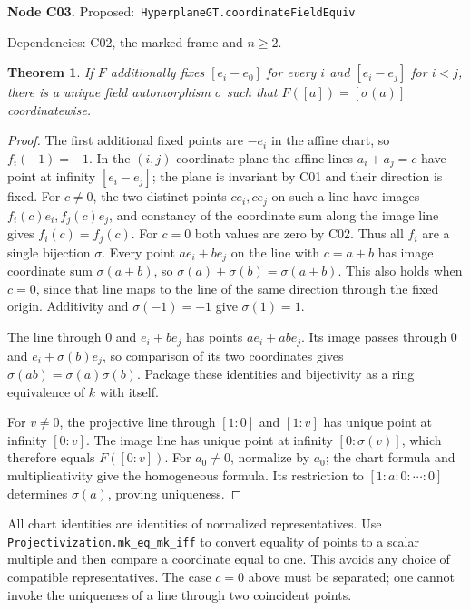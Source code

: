 \documentclass[11pt]{article}
\newtheorem{theorem}{Theorem}[section]
\theoremstyle{remark}\newtheorem{remark}[theorem]{Remark}
\newcommand{\code}[1]{\nolinkurl{#1}}
\newcommand{\node}[3]{\par\Needspace{8\baselineskip}\smallskip\noindent\textbf{Node #1.}\quad
 \textsf{Proposed:}\ \code{#2}\par\noindent
 \textsf{Dependencies:} #3.\par\smallskip}
\begin{document}
\node{C03}{HyperplaneGT.coordinateFieldEquiv}{C02, the marked frame and $n\ge2$}
\begin{theorem}\label{thm:c03}
If $F$ additionally fixes $[e_i-e_0]$ for every $i$ and
$[e_i-e_j]$ for $i<j$, there is a unique field automorphism
$\sigma$ such that $F([a])=[\sigma(a)]$ coordinatewise.
\end{theorem}
\begin{proof}
The first additional fixed points are $-e_i$ in the affine
chart, so $f_i(-1)=-1$. In the $(i,j)$ coordinate plane the
affine lines $a_i+a_j=c$ have point at infinity $[e_i-e_j]$;
the plane is invariant by C01 and their direction is fixed.
For $c\ne0$, the two distinct points $ce_i,ce_j$ on such a
line have images $f_i(c)e_i,f_j(c)e_j$, and constancy of the
coordinate sum along the image line gives $f_i(c)=f_j(c)$.
For $c=0$ both values are zero by C02. Thus all $f_i$ are a
single bijection $\sigma$. Every point $ae_i+be_j$ on the
line with $c=a+b$ has image coordinate sum $\sigma(a+b)$,
so $\sigma(a)+\sigma(b)=\sigma(a+b)$. This also holds when
$c=0$, since that line maps to the line of the same direction
through the fixed origin. Additivity and $\sigma(-1)=-1$
give $\sigma(1)=1$.

The line through $0$ and $e_i+be_j$ has points
$ae_i+abe_j$. Its image passes through $0$ and
$e_i+\sigma(b)e_j$, so comparison of its two coordinates gives
$\sigma(ab)=\sigma(a)\sigma(b)$. Package these identities and
bijectivity as a ring equivalence of $k$ with itself.

For $v\ne0$, the projective line through $[1:0]$ and $[1:v]$
has unique point at infinity $[0:v]$. The image line has
unique point at infinity $[0:\sigma(v)]$, which therefore
equals $F([0:v])$. For $a_0\ne0$, normalize by $a_0$; the
chart formula and multiplicativity give the homogeneous
formula. Its restriction to $[1:a:0:\cdots:0]$ determines
$\sigma(a)$, proving uniqueness.
\end{proof}
All chart identities are identities of normalized representatives.
Use \code{Projectivization.mk_eq_mk_iff} to convert equality of
points to a scalar multiple and then compare a coordinate equal
to one. This avoids any choice of compatible representatives.
The case $c=0$ above must be separated; one cannot invoke the
uniqueness of a line through two coincident points.
\end{document}
